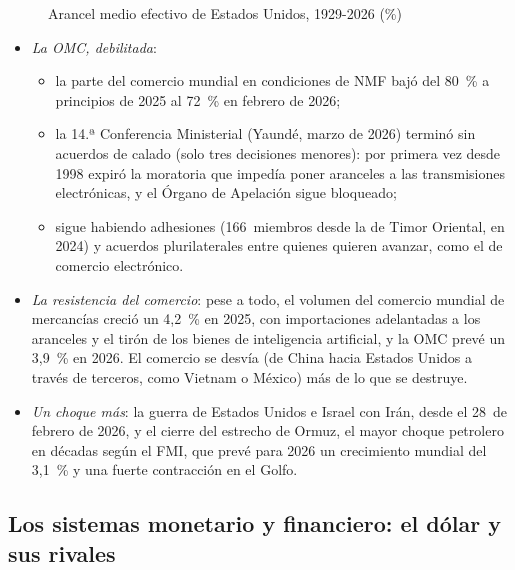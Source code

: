 \documentclass[11pt]{article}
\begin{document}
\begin{figure}[H]
\centering
\caption{Arancel medio efectivo de Estados Unidos, 1929-2026 (\%)}\label{fig:arancel-eeuu}
\end{figure}

\begin{itemize}
\item \emph{La OMC, debilitada}:
  \begin{itemize}
  \item la parte del comercio mundial en condiciones de NMF bajó del 80~\% a principios de 2025 al 72~\% en febrero de 2026\nocite{OMC2026Perspectivas};
  \item la 14.ª Conferencia Ministerial (Yaundé, marzo de 2026) terminó sin acuerdos de calado (solo tres decisiones menores): por primera vez desde 1998 expiró la moratoria que impedía poner aranceles a las transmisiones electrónicas, y el Órgano de Apelación sigue bloqueado\nocite{OMC2026CM14,USTR2026CM14};
  \item sigue habiendo adhesiones (166~miembros desde la de Timor Oriental, en 2024) y acuerdos plurilaterales entre quienes quieren avanzar, como el de comercio electrónico\nocite{OMC2026Miembros}.
  \end{itemize}
\item \emph{La resistencia del comercio}: pese a todo, el volumen del comercio mundial de mercancías creció un 4,2~\% en 2025, con importaciones adelantadas a los aranceles y el tirón de los bienes de inteligencia artificial, y la OMC prevé un 3,9~\% en 2026\nocite{OMC2026PrensaOct}. El comercio se desvía (de China hacia Estados Unidos a través de terceros, como Vietnam o México) más de lo que se destruye.
\item \emph{Un choque más}: la guerra de Estados Unidos e Israel con Irán, desde el 28~de febrero de 2026, y el cierre del estrecho de Ormuz, el mayor choque petrolero en décadas según el FMI, que prevé para 2026 un crecimiento mundial del 3,1~\% y una fuerte contracción en el Golfo\nocite{FMI2026WEO}.
\end{itemize}

\subsection{Los sistemas monetario y financiero: el dólar y sus rivales}\label{sec:monetario-actual}
\end{document}
